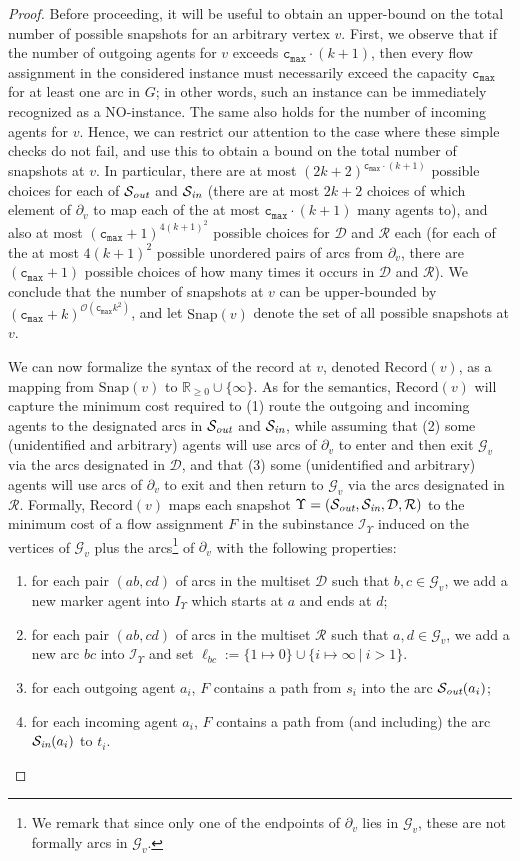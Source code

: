 \documentclass[letterpaper]{article} %
\newcommand{\bigoh}{\ensuremath{{\mathcal O}}}
\newcommand{\cmax}{\mathtt{c_{max}}}
\newcommand{\forgottenG}{\mathcal{G}}
\newcommand{\Rec}{\text{Record}}
\renewcommand{\R}{\mathcal{R}}
\renewcommand{\D}{\mathcal{D}}
\newcommand{\Sout}{\mathcal{S}_\emph{out}}
\newcommand{\Sin}{\mathcal{S}_\emph{in}}
\newcommand{\snap}{\text{Snap}}
\begin{document}
\begin{proof}
Before proceeding, it will be useful to obtain an upper-bound on the total number of possible snapshots for an arbitrary vertex $v$. First, we observe that if the number of outgoing agents for $v$ exceeds $\cmax \cdot(k+1)$, then every flow assignment in the considered instance must necessarily exceed the capacity $\cmax$ for at least one arc in $G$; in other words, such an instance can be immediately recognized as a NO-instance. The same also holds for the number of incoming agents for $v$. Hence, we can restrict our attention to the case where these simple checks do not fail, and use this to obtain a bound on the total number of snapshots at $v$. In particular, there are at most $(2k+2)^{\cmax \cdot(k+1)}$ possible choices for each of $\Sout$ and $\Sin$ (there are at most $2k+2$ choices of which element of $\partial_v$ to map each of the at most $\cmax \cdot(k+1)$ many agents to), and also at most $(\cmax+1)^{4(k+1)^2}$ possible choices for $\D$ and $\R$ each (for each of the at most $4(k+1)^2$ possible unordered pairs of arcs from $\partial_v$, there are $(\cmax+1)$ possible choices of how many times it occurs in $\D$ and $\R$). We conclude that the number of snapshots at $v$ can be upper-bounded by $(\cmax+k)^{\bigoh(\cmax k^2)}$, and let $\snap(v)$ denote the set of all possible snapshots at $v$.

We can now formalize the syntax of the record at $v$, denoted $\Rec(v)$, as a mapping from $\snap(v)$ to $\mathbb{R}_{\geq 0}\cup \{\infty\}$. As for the semantics, $\Rec(v)$ will capture the minimum cost required to (1) route the outgoing and incoming agents to the designated arcs in $\Sout$ and $\Sin$, while assuming that (2) some (unidentified and arbitrary) agents will use arcs of $\partial_v$ to enter and then exit $\forgottenG_v$ via the arcs designated in $\D$, and that (3) some (unidentified and arbitrary) agents will use arcs of $\partial_v$ to exit and then return to $\forgottenG_v$ via the arcs designated in~$\R$. 
Formally, $\Rec(v)$ maps each snapshot $\Upsilon=(\Sout,\Sin,\D,\R)$ to the minimum cost of a flow assignment $F$ in the subinstance $\mathcal{I}_\Upsilon$ induced on the vertices of $\forgottenG_v$ plus the arcs\footnote{We remark that since only one of the endpoints of $\partial_v$ lies in $\forgottenG_v$, these are not formally arcs in $\forgottenG_v$.} of $\partial_v$ with the following properties:
\begin{enumerate}
\item for each pair $(ab,cd)$ of arcs in the multiset $\D$ such that $b,c\in \forgottenG_v$, we add a new marker agent into $I_\Upsilon$ which starts at $a$ and ends at $d$;
\item for each pair $(ab,cd)$ of arcs in the multiset $\R$ such that $a,d\in \forgottenG_v$, we add a new arc $bc$ into $\mathcal{I}_\Upsilon$ and set $\ell_{bc}:=\{1\mapsto 0\}\cup \{i\mapsto \infty~|~i>1\}$.
\item for each outgoing agent $a_i$, $F$ contains a path from $s_i$ into the arc $\Sout(a_i)$;
\item for each incoming agent $a_i$, $F$ contains a path from (and including) the arc $\Sin(a_i)$ to $t_i$.
\end{enumerate}


\end{proof}
\end{document}
